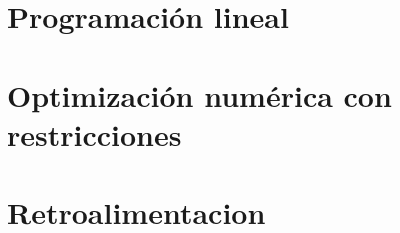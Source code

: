 \documentclass[a4,11pt]{aleph-notas}
\begin{document}
\encabezado

\section{Programación lineal}

\section{Optimización numérica con restricciones}

\section{Retroalimentacion}
\end{document}
